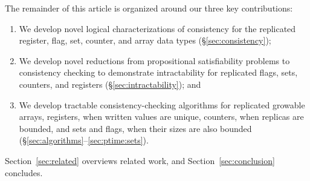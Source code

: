 The remainder of this article is organized around our three key contributions:
\begin{enumerate}

  \item We develop novel logical characterizations of consistency for the replicated register, flag, set, counter, and array data types (§\ref{sec:consistency});

  \item We develop novel reductions from propositional satisfiability problems to consistency checking to demonstrate intractability for replicated flags, sets, counters, and registers (§\ref{sec:intractability}); and

  \item We develop tractable consistency-checking algorithms for replicated growable arrays, registers, when written values are unique, counters, when replicas are bounded, and sets and flags, when their sizes are also bounded (§\ref{sec:algorithms}–\ref{sec:ptime:sets}).

\end{enumerate}
Section~\ref{sec:related} overviews related work, and Section~\ref{sec:conclusion} concludes.
